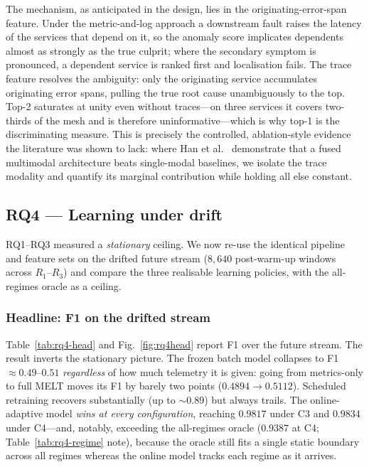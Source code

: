 \documentclass[acmsmall]{acmart}
\begin{document}
The mechanism, as anticipated in the design, lies in the originating-error-span feature. Under the metric-and-log approach a downstream fault raises the latency of the services that depend on it, so the anomaly score implicates dependents almost as strongly as the true culprit; where the secondary symptom is pronounced, a dependent service is ranked first and localisation fails. The trace feature resolves the ambiguity: only the originating service accumulates originating error spans, pulling the true root cause unambiguously to the top. Top-2 saturates at unity even without traces---on three services it covers two-thirds of the mesh and is therefore uninformative---which is why top-1 is the discriminating measure. This is precisely the controlled, ablation-style evidence the literature was shown to lack: where Han et al.\ \cite{han2024} demonstrate that a fused multimodal architecture beats single-modal baselines, we isolate the trace modality and quantify its marginal contribution while holding all else constant.

\subsection{RQ4 --- Learning under drift}\label{sec:res-rq4}

RQ1--RQ3 measured a \emph{stationary} ceiling. We now re-use the identical pipeline and feature sets on the drifted future stream ($8{,}640$ post-warm-up windows across $R_1$--$R_3$) and compare the three realisable learning policies, with the all-regimes oracle as a ceiling.

\subsubsection{Headline: F1 on the drifted stream}\label{sec:res-rq4-head}

Table~\ref{tab:rq4-head} and Fig.~\ref{fig:rq4head} report F1 over the future stream. The result inverts the stationary picture. The frozen batch model collapses to F1 $\approx 0.49$--$0.51$ \emph{regardless} of how much telemetry it is given: going from metrics-only to full MELT moves its F1 by barely two points ($0.4894 \rightarrow 0.5112$). Scheduled retraining recovers substantially (up to $\sim 0.89$) but always trails. The online-adaptive model \emph{wins at every configuration}, reaching $0.9817$ under C3 and $0.9834$ under C4---and, notably, exceeding the all-regimes oracle ($0.9387$ at C4; Table~\ref{tab:rq4-regime} note), because the oracle still fits a single static boundary across all regimes whereas the online model tracks each regime as it arrives.
\end{document}

